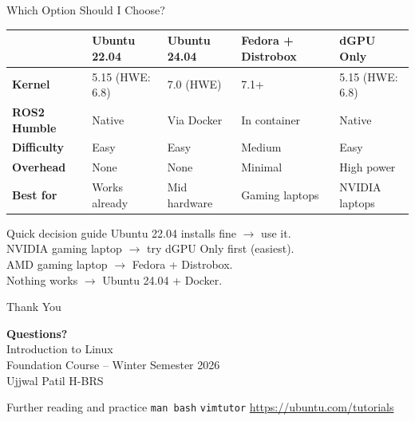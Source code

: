 \documentclass[aspectratio=169]{beamer}
\begin{document}
\begin{frame}[shrink=5]{Which Option Should I Choose?}
  \small
  \begin{table}
    \begin{tabularx}{\textwidth}{lXXXX}
      & \textbf{Ubuntu 22.04}
      & \textbf{Ubuntu 24.04}
      & \textbf{Fedora + Distrobox}
      & \textbf{dGPU Only} \\
      \toprule
      \textbf{Kernel}
        & 5.15 (HWE: 6.8) & 7.0 (HWE) & 7.1+ & 5.15 (HWE: 6.8) \\
      \textbf{ROS2 Humble}
        & Native & Via Docker & In container & Native \\
      \textbf{Difficulty}
        & Easy & Easy & Medium & Easy \\
      \textbf{Overhead}
        & None & None & Minimal & High power \\
      \textbf{Best for}
        & Works already & Mid hardware & Gaming laptops & NVIDIA laptops \\
      \bottomrule
    \end{tabularx}
  \end{table}
  \vspace{0.4em}
  \begin{block}{Quick decision guide}
    Ubuntu 22.04 installs fine $\rightarrow$ use it.\\
    NVIDIA gaming laptop $\rightarrow$ try dGPU Only first (easiest).\\
    AMD gaming laptop $\rightarrow$ Fedora + Distrobox.\\
    Nothing works $\rightarrow$ Ubuntu 24.04 + Docker.
  \end{block}
\end{frame}

\begin{frame}{Thank You}
  \begin{center}
    \vspace{0.5em}
    {\Large\textbf{Questions?}}\\[1.2em]
    {\large Introduction to Linux}\\[0.3em]
    {\normalsize Foundation Course -- Winter Semester 2026}\\[0.3em]
    {\normalsize Ujjwal Patil \quad H-BRS}\\[1.2em]
    \begin{block}{Further reading and practice}
      \texttt{man bash} \quad
      \texttt{vimtutor} \quad
      \url{https://ubuntu.com/tutorials}
    \end{block}
  \end{center}
\end{frame}
\end{document}
